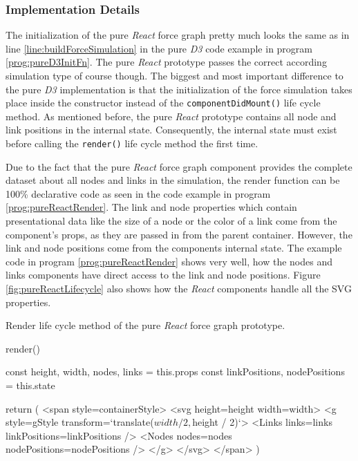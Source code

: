 \subsubsection{Implementation Details}

The initialization of the pure \emph{React} force graph pretty much looks the same as in line \ref{line:buildForceSimulation} in the pure \emph{D3} code example in program \ref{prog:pureD3InitFn}. The pure \emph{React} prototype passes the correct according simulation type of course though. The biggest and most important difference to the pure \emph{D3} implementation is that the initialization of the force simulation takes place inside the constructor instead of the \texttt{componentDidMount()} life cycle method. As mentioned before, the pure \emph{React} prototype contains all node and link positions in the internal state. Consequently, the internal state must exist before calling the \texttt{render()} life cycle method the first time.

Due to the fact that the pure \emph{React} force graph component provides the complete dataset about all nodes and links in the simulation, the render function can be 100\% declarative code as seen in the code example in program \ref{prog:pureReactRender}. The link and node properties which contain presentational data like the size of a node or the color of a link come from the component's props, as they are passed in from the parent container. However, the link and node positions come from the components internal state. The example code in program \ref{prog:pureReactRender} shows very well, how the nodes and links components have direct access to the link and node positions. Figure \ref{fig:pureReactLifecycle} also shows how the \emph{React} components handle all the SVG properties.

\begin{program}
\caption{Render life cycle method of the pure \emph{React} force graph prototype.}
\label{prog:pureReactRender}
\begin{JsCode}
render() {
  const { height, width, nodes, links } = this.props
  const { linkPositions, nodePositions } = this.state
  
  return (
    <span style={containerStyle}>
      <svg height={height} width={width}>
        <g style={gStyle} transform={`translate(${width / 2},${height / 2})`}>
          <Links links={links} linkPositions={linkPositions} />
          <Nodes nodes={nodes} nodePositions={nodePositions} />
        </g>
      </svg>
    </span>
  )
}
\end{JsCode}
\end{program}

